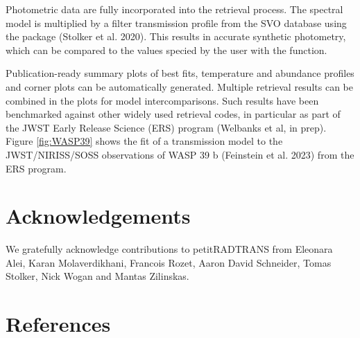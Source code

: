 \documentclass[10pt,a4paper,onecolumn]{article}
\let\textttOrig=\texttt
\def\texttt#1{\expandafter\textttOrig{\seqsplit{#1}}}
\let\addcontentslineOrig=\addcontentsline
\def\addcontentsline#1#2#3{\bgroup
  \let\texttt=\textttOrig\addcontentslineOrig{#1}{#2}{#3}\egroup}
\begin{document}
Photometric data are fully incorporated into the retrieval process. The
spectral model is multiplied by a filter transmission profile from the
SVO database using the \texttt{species} package (Stolker et al. 2020).
This results in accurate synthetic photometry, which can be compared to
the values specied by the user with the \texttt{add\_photometry}
function.

Publication-ready summary plots of best fits, temperature and abundance
profiles and corner plots can be automatically generated. Multiple
retrieval results can be combined in the plots for model
intercomparisons. Such results have been benchmarked against other
widely used retrieval codes, in particular as part of the JWST Early
Release Science (ERS) program (Welbanks et al, in prep). Figure
\ref{fig:WASP39} shows the fit of a transmission model to the
JWST/NIRISS/SOSS observations of WASP 39 b (Feinstein et al. 2023) from
the ERS program.

\section{Acknowledgements}\label{acknowledgements}

We gratefully acknowledge contributions to petitRADTRANS from Eleonara
Alei, Karan Molaverdikhani, Francois Rozet, Aaron David Schneider, Tomas
Stolker, Nick Wogan and Mantas Zilinskas.

\section*{References}\label{references}
\end{document}
